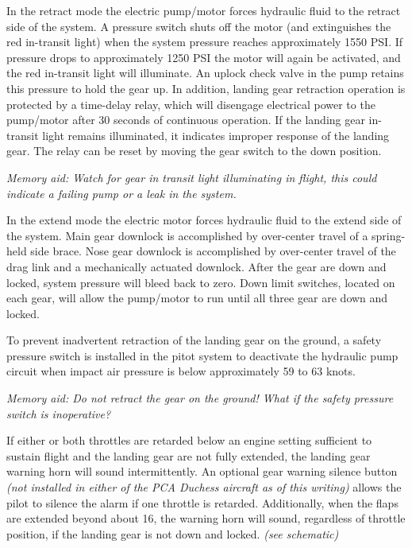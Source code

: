 In the retract mode the electric pump/motor forces hydraulic fluid to the retract side of the system. A pressure
switch shuts off the motor (and extinguishes the red in-transit light) when the system pressure reaches approximately
1550 PSI. If pressure drops to approximately 1250 PSI the motor will again be activated, and the red in-transit light
will illuminate. An uplock check valve in the pump retains this pressure to hold the gear up. In addition, landing
gear retraction operation is protected by a time-delay relay, which will disengage electrical power to the pump/motor
after 30 seconds of continuous operation. If the landing gear in-transit light remains illuminated, it indicates
improper response of the landing gear. The relay can be reset by moving the gear switch to the down position.

\emph{Memory aid: Watch for gear in transit light illuminating in flight, this could indicate a failing pump or a leak in the system.}

In the extend mode the electric motor forces hydraulic fluid to the extend side of the system. Main gear downlock is
accomplished by over-center travel of a spring-held side brace. Nose gear downlock is accomplished by over-center
travel of the drag link and a mechanically actuated downlock. After the gear are down and locked, system pressure
will bleed back to zero. Down limit switches, located on each gear, will allow the pump/motor to run until all three
gear are down and locked.

To prevent inadvertent retraction of the landing gear on the ground, a safety pressure switch is installed in the pitot
system to deactivate the hydraulic pump circuit when impact air pressure is below approximately 59 to 63 knots.

\emph{Memory aid: Do not retract the gear on the ground! What if the safety pressure switch is inoperative?}

If either or both throttles are retarded below an engine setting sufficient to sustain flight and the landing gear are not
fully extended, the landing gear warning horn will sound intermittently. An optional gear warning silence button
\emph{(not installed in either of the PCA Duchess aircraft as of this writing)}
allows the pilot to silence the alarm if one throttle is retarded. Additionally, when the flaps are extended beyond
about 16\degree, the warning horn will sound, regardless of throttle position, if the landing gear is not down and locked.
\emph{(see schematic)}

